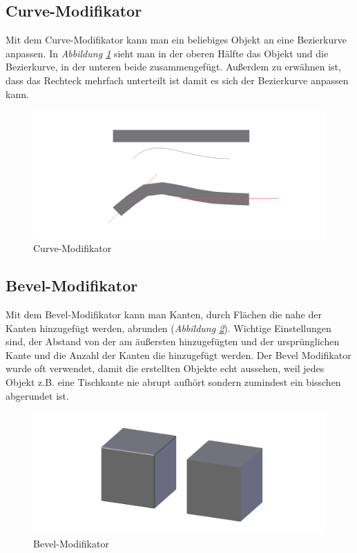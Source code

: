 \subsection{Curve-Modifikator}
\label{Curve:heading}
Mit dem Curve-Modifikator kann man ein beliebiges Objekt an eine Bezierkurve anpassen.\citep{blender:curve_modifier} In \textit{Abbildung \ref{modifikatoren:image4}} sieht man
in der oberen Hälfte das Objekt und die Bezierkurve, in der unteren beide zusammengefügt.
Außerdem zu erwähnen ist, dass das Rechteck mehrfach unterteilt ist damit es sich der Bezierkurve anpassen kann.
\begin{figure}[H]
    \centering
    \includegraphics[width=.8\textwidth]{images/Modifikatoren-Curve.png}
    \caption{Curve-Modifikator}
    \label{modifikatoren:image4}
\end{figure}

\subsection{Bevel-Modifikator}
\label{Bevel:heading}
Mit dem Bevel-Modifikator kann man Kanten, durch Flächen die nahe der Kanten hinzugefügt werden, abrunden (\textit{Abbildung \ref{modifikatoren:image5}}).\citep{blender:bevel_modifier}
Wichtige Einstellungen sind, der Abstand von der am äußersten hinzugefügten und der ursprünglichen Kante und die Anzahl der Kanten die hinzugefügt werden.
Der Bevel Modifikator wurde oft verwendet, damit die erstellten Objekte echt aussehen, weil jedes Objekt z.B. eine Tischkante nie abrupt
aufhört sondern zumindest ein bisschen abgerundet ist.
\begin{figure}[H]
    \centering
    \includegraphics[width=.8\textwidth]{images/Modifikatoren-Bevel.png}
    \caption{Bevel-Modifikator}
    \label{modifikatoren:image5}
\end{figure}

